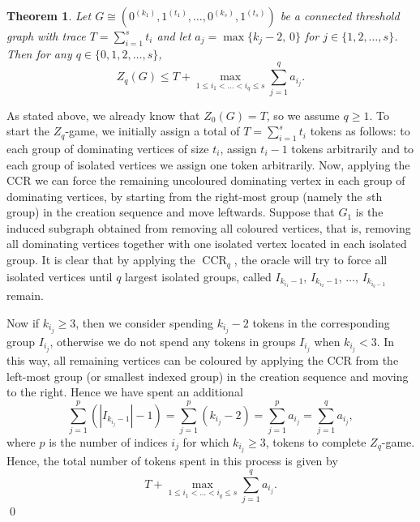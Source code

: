 \documentclass[3p,times,12pt]{article}
\newtheorem{theorem}{Theorem}[section]
\newenvironment{pf}{\medskip {Proof:  \hspace*{-.4cm}}
    \enspace}{\hfill \qed \newline \medskip}
\DeclareMathOperator{\CCR}{CCR}
\begin{document}
\begin{theorem}\label{thm:upperbound on z_q}
 Let $G\cong (0^{(k_1)}, 1^{(t_1)}, \ldots,0^{(k_s)}, 1^{(t_s)})$ be a connected threshold graph with trace $T=\sum_{i=1}^s t_i$ and let $a_j=\max\{k_j-2,\,0\}$ for $j\in \{1,2,\ldots,s\}$. Then for any $q\in \{0,1,2,\ldots,s\}$, 
 \begin{equation}\label{upper on z_q}
 Z_q(G)\le T+\max_{1 \le i_1<\ldots<i_q \le s} \sum_{j=1}^q a_{i_j}.
 \end{equation}
\end{theorem}
\begin{pf}
As stated above, we already know that $Z_0(G)=T$, so we assume $q\geq 1$. To start the $Z_q$-game, we initially assign a total of $T=\sum_{i=1}^s t_i$ tokens as follows: to each group of dominating vertices of size $t_i$, assign $t_i-1$ tokens arbitrarily and to each group of isolated vertices we assign one token arbitrarily. 
Now, applying the CCR we can force the remaining uncoloured dominating vertex in each group of dominating vertices, by starting from the right-most group (namely the $s$th group) in the creation sequence and move leftwards. Suppose that $G_1$ is the induced subgraph obtained from removing all coloured vertices, that is, removing all dominating vertices together with one isolated vertex located in each isolated group. It is clear that by applying the  $\CCR_q$, the oracle will try to force all isolated vertices until $q$ largest isolated groups, called $I_{k_{i_1}-1},\, I_{k_{i_2}-1},\, \ldots,\, I_{k_{i_{q}-1}}$ remain. 

Now if $k_{i_j}\ge 3$, then we consider spending $k_{i_j}-2$ tokens in the corresponding group $I_{i_j}$, otherwise we do not spend any tokens in groups $I_{i_j}$ when $k_{i_j}<3$. In this way, all remaining vertices can be coloured by applying the CCR from the left-most group (or smallest indexed group) in the creation sequence and moving to the right. Hence we have spent an additional 
$$\sum_{j=1}^p (|I_{k_{i_j}-1}|-1)=\sum_{j=1}^p (k_{i_j}-2)=\sum_{j=1}^p a_{i_j}=\sum_{j=1}^q a_{i_j},$$ 
where $p$ is the number of indices $i_j$ for which  $k_{i_j}\ge 3$, 
tokens to complete  $Z_q$-game. Hence,  the total number of tokens spent in this process is given by $$T+\max_{1 \le i_1<\ldots<i_q \le s} \sum_{j=1}^q a_{i_j}.$$
\end{pf}
\end{document}
